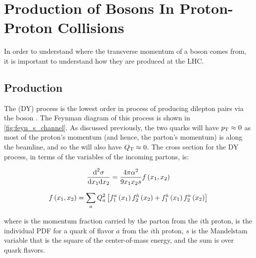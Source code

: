 

\section{Production of \texorpdfstring{\Z}{Z} Bosons In Proton-Proton Collisions}
\label{sec:z_production}

In order to understand where the transverse momentum of a \Z boson comes from,
it is important to understand how they are produced at the LHC.

\subsection{\DrellYan Production}
\label{ssec:dy_production}

The \DrellYan (DY) process is the lowest order in \alphastrong process of
producing dilepton pairs via the \Z boson \cite{drell_1970}\cite{drell_1970a}.
The Feynman diagram of this process is shown in \cref{fig:feyn_s_channel}. As
discussed previously, the two quarks will have $p_{\mathrm{T}} \approx 0$ as most of the
proton's momentum (and hence, the parton's momentum) is along the beamline, and
so the \Z will also have $Q_{\mathrm{T}} \approx 0$. The cross section for the DY
process, in terms of the  variables of the incoming partons, is:

\begin{equation}\label{eq:drell_yan_cross_section}
    \frac{\text{d}^{2}\sigma}
    {\text{d}x_{1} \text{d}x_{2}}
    =
    \frac{4 \pi \alpha^{2}}
    {9 x_{1} x_{2} s}
    f \left( x_{1}, x_{2} \right)
\end{equation}

\begin{equation}\label{eq:fx}
    f \left( x_{1}, x_{2} \right)
    =
    \sum_{a}
    Q^{2}_{a}
    \left[
        f^{a}_{1} \left( x_{1} \right)
        f^{\bar{a}}_{2} \left( x_{2} \right)
        +
        f^{\bar{a}}_{1} \left( x_{1} \right)
        f^{a}_{2} \left( x_{2} \right)
    \right]
\end{equation}

where  is the momentum fraction carried by the parton from the
$i$th proton,  is the individual PDF for a quark of
flavor $a$ from the $i$th proton, $s$ is the Mandelstam variable that is
the square of the center-of-mass energy, and the sum is over quark flavors.



